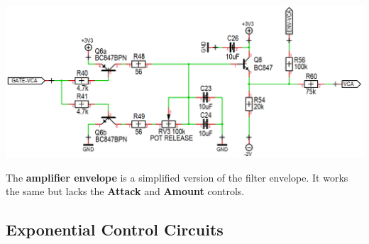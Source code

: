 \documentclass{scrartcl}
\begin{document}
\begin{center}
    \includegraphics[scale=0.38]{assets/schema-ar-vca.png}
\end{center}

The \textbf{amplifier envelope} is a simplified version of the filter envelope. It works the same but lacks the \textbf{Attack} and \textbf{Amount} controls.

\subsection{Exponential Control Circuits}
\end{document}
